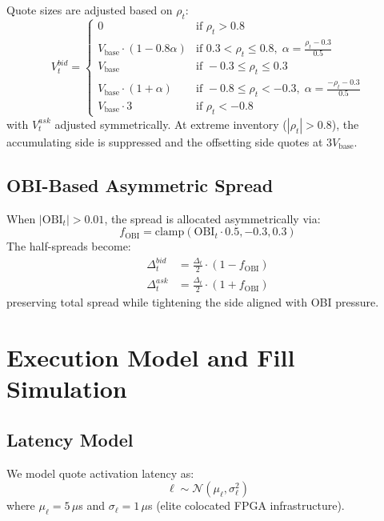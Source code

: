 \documentclass[11pt]{article}
\theoremstyle{definition}
\begin{document}
Quote sizes are adjusted based on $\rho_t$:
\begin{equation}
V_t^{bid} = \begin{cases}
0 & \text{if } \rho_t > 0.8 \\
V_{\text{base}} \cdot (1 - 0.8\alpha) & \text{if } 0.3 < \rho_t \leq 0.8, \; \alpha = \frac{\rho_t - 0.3}{0.5} \\
V_{\text{base}} & \text{if } -0.3 \leq \rho_t \leq 0.3 \\
V_{\text{base}} \cdot (1 + \alpha) & \text{if } -0.8 \leq \rho_t < -0.3, \; \alpha = \frac{-\rho_t - 0.3}{0.5} \\
V_{\text{base}} \cdot 3 & \text{if } \rho_t < -0.8
\end{cases}
\end{equation}
with $V_t^{ask}$ adjusted symmetrically. At extreme inventory ($|\rho_t| > 0.8$), the accumulating side is suppressed and the offsetting side quotes at $3 V_{\text{base}}$.

\subsection{OBI-Based Asymmetric Spread}

When $|\text{OBI}_t| > 0.01$, the spread is allocated asymmetrically via:
\begin{equation}
f_{\text{OBI}} = \text{clamp}(\text{OBI}_t \cdot 0.5, -0.3, 0.3)
\end{equation}
The half-spreads become:
\begin{align}
\Delta_t^{bid} &= \frac{\Delta_t}{2} \cdot (1 - f_{\text{OBI}}) \\
\Delta_t^{ask} &= \frac{\Delta_t}{2} \cdot (1 + f_{\text{OBI}})
\end{align}
preserving total spread while tightening the side aligned with OBI pressure.

\section{Execution Model and Fill Simulation}

\subsection{Latency Model}

We model quote activation latency as:
\begin{equation}
\ell \sim \mathcal{N}(\mu_\ell, \sigma_\ell^2)
\end{equation}
where $\mu_\ell = 5\,\mu$s and $\sigma_\ell = 1\,\mu$s (elite colocated FPGA infrastructure).
\end{document}
